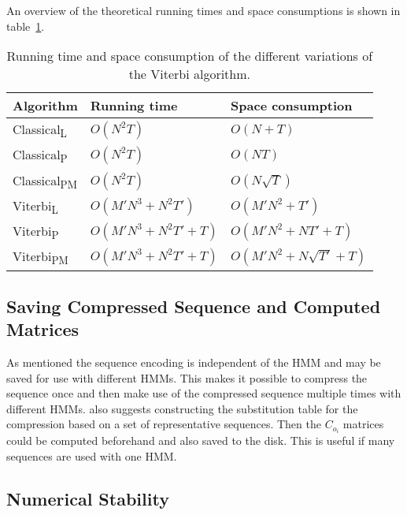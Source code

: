 An overview of the theoretical running times and space consumptions is shown in
table~\ref{tab:running-time}.

\begin{table}
  \centering
  \caption{Running time and space consumption of the different variations of the
    Viterbi algorithm.}
  \label{tab:running-time}
  \begin{tabular}{lll}
    \toprule
    Algorithm                   & Running time             & Space consumption             \\
    \midrule
    Classical\textsubscript{L}  & $O(N^2 T)$               & $O(N + T)$                    \\
    Classical\textsubscript{P}  & $O(N^2 T)$               & $O(NT)$                       \\
    Classical\textsubscript{PM} & $O(N^2 T)$               & $O(N\sqrt{T})$                \\
    Viterbi\textsubscript{L}    & $O(M' N^3 + N^2 T')$     & $O(M' N^2 + T')$              \\
    Viterbi\textsubscript{P}    & $O(M' N^3 + N^2 T' + T)$ & $O(M' N^2 + N T' + T)$        \\
    Viterbi\textsubscript{PM}   & $O(M' N^3 + N^2 T' + T)$ & $O(M' N^2 + N \sqrt{T'} + T)$ \\
    \bottomrule
  \end{tabular}
\end{table}

\subsection{Saving Compressed Sequence and Computed Matrices}
\label{sec:saving-compr-sequ}

As mentioned the sequence encoding is independent of the HMM and may be saved
for use with different HMMs. This makes it possible to compress the sequence
once and then make use of the compressed sequence multiple times with different
HMMs. \citet{lifshits2009speeding} also suggests constructing the substitution
table for the compression based on a set of representative sequences. Then the
$C_{o_i}$ matrices could be computed beforehand and also saved to the
disk. This is useful if many sequences are used with one HMM.\

\subsection{Numerical Stability}

